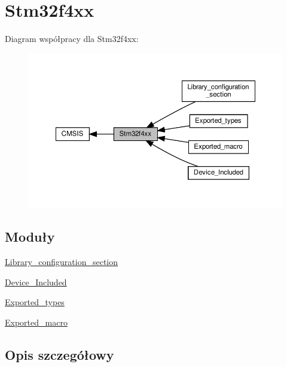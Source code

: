 \hypertarget{group__stm32f4xx}{}\section{Stm32f4xx}
\label{group__stm32f4xx}
Diagram współpracy dla Stm32f4xx\+:\nopagebreak
\begin{figure}[H]
\begin{center}
\leavevmode
\includegraphics[width=350pt]{group__stm32f4xx}
\end{center}
\end{figure}
\subsection*{Moduły}
\begin{DoxyCompactItemize}
\item 
\hyperlink{group___library__configuration__section}{Library\+\_\+configuration\+\_\+section}
\item 
\hyperlink{group___device___included}{Device\+\_\+\+Included}
\item 
\hyperlink{group___exported__types}{Exported\+\_\+types}
\item 
\hyperlink{group___exported__macro}{Exported\+\_\+macro}
\end{DoxyCompactItemize}


\subsection{Opis szczegółowy}
